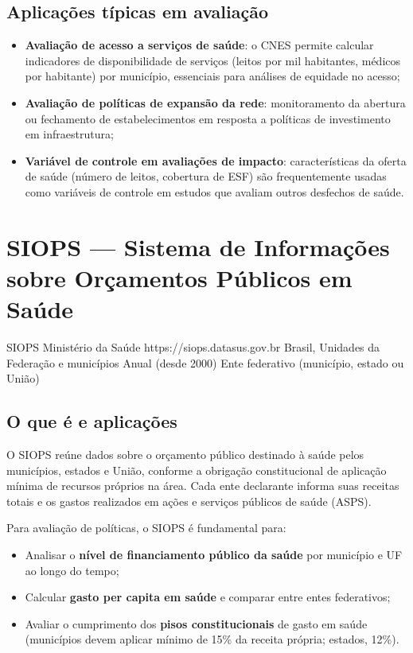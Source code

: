 \subsection{Aplicações típicas em avaliação}

\begin{itemize}
  \item \textbf{Avaliação de acesso a serviços de saúde}: o CNES permite calcular indicadores de disponibilidade de serviços (leitos por mil habitantes, médicos por habitante) por município, essenciais para análises de equidade no acesso;
  \item \textbf{Avaliação de políticas de expansão da rede}: monitoramento da abertura ou fechamento de estabelecimentos em resposta a políticas de investimento em infraestrutura;
  \item \textbf{Variável de controle em avaliações de impacto}: características da oferta de saúde (número de leitos, cobertura de ESF) são frequentemente usadas como variáveis de controle em estudos que avaliam outros desfechos de saúde.
\end{itemize}

\section{SIOPS --- Sistema de Informações sobre Orçamentos Públicos em Saúde}

\ficharapida
  {SIOPS}
  {Ministério da Saúde}
  {https://siops.datasus.gov.br}
  {Brasil, Unidades da Federação e municípios}
  {Anual (desde 2000)}
  {Ente federativo (município, estado ou União)}

\subsection{O que é e aplicações}

O SIOPS reúne dados sobre o orçamento público destinado à saúde pelos municípios, estados e União, conforme a obrigação constitucional de aplicação mínima de recursos próprios na área. Cada ente declarante informa suas receitas totais e os gastos realizados em ações e serviços públicos de saúde (ASPS).

Para avaliação de políticas, o SIOPS é fundamental para:
\begin{itemize}
  \item Analisar o \textbf{nível de financiamento público da saúde} por município e UF ao longo do tempo;
  \item Calcular \textbf{gasto per capita em saúde} e comparar entre entes federativos;
  \item Avaliar o cumprimento dos \textbf{pisos constitucionais} de gasto em saúde (municípios devem aplicar mínimo de 15\% da receita própria; estados, 12\%).
\end{itemize}

